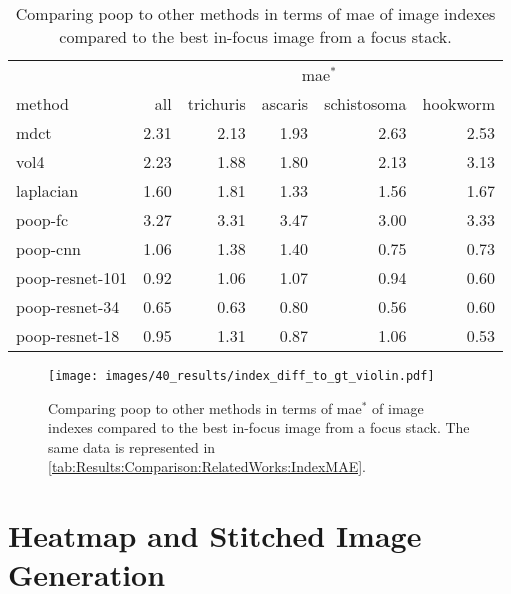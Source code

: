 \begin{table}
    \centering
    \caption{Comparing \acs{poop} to other methods in terms of \ac{mae} of image indexes compared to the best in-focus image from a focus stack.}
    \begin{tabular}{lrrrrr}
        \hline
        \multicolumn{1}{c}{} & \multicolumn{5}{c}{\ac{mae}$^*$} \\
        \cline{2-6}
        method & all & trichuris & ascaris & schistosoma & hookworm \\
        \hline
        \acs{mdct}      & 2.31 & 2.13 & 1.93 & 2.63 & 2.53 \\
        \acs{vol4}      & 2.23 & 1.88 & 1.80 & 2.13 & 3.13 \\
        \acs{laplacian} & 1.60 & 1.81 & 1.33 & 1.56 & 1.67 \\
        \hline
        \acs{poop}-\acs{fc}              & 3.27 & 3.31 & 3.47 & 3.00 & 3.33 \\
        \acs{poop}-\acs{cnn}             & 1.06 & 1.38 & 1.40 & 0.75 & 0.73 \\
        \acs{poop}-\acs{resnet}-101      & 0.92 & 1.06 & 1.07 & 0.94 & 0.60 \\
        \acs{poop}-\acs{resnet}-34       & 0.65 & 0.63 & 0.80 & 0.56 & 0.60 \\
        \acs{poop}-\acs{resnet}-18       & 0.95 & 1.31 & 0.87 & 1.06 & 0.53 \\
    \end{tabular}
    \label{tab:Results:Comparison:RelatedWorks:IndexMAE}
\end{table}

\begin{figure}
    \centering
    \texttt{[image: images/40\_results/index\_diff\_to\_gt\_violin.pdf]}
    \caption{Comparing \acs{poop} to other methods in terms of \ac{mae}$^*$ of image indexes compared to the best in-focus image from a focus stack. The same data is represented in \autoref{tab:Results:Comparison:RelatedWorks:IndexMAE}.}
    \label{fig:Results:Comparison:RelatedWorks:IndexMAE}
\end{figure}


\section{Heatmap and Stitched Image Generation}
\label{sec:Results:HeatStiched}

